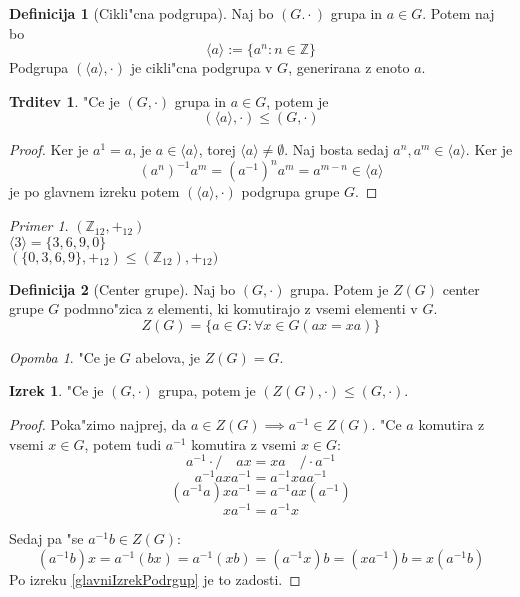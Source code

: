 \documentclass{article}
\theoremstyle{definition}
\newtheorem{definition}{Definicija}[section]
\newtheorem{claim}{Trditev}[section]
\newtheorem{theorem}{Izrek}[section]
\theoremstyle{remark}
\newtheorem*{ex}{Primer}
\newtheorem*{rem}{Opomba}
\newcommand{\Z}{\mathbb{Z}}
\begin{document}
	\begin{definition}[Cikli"cna podgrupa]
		Naj bo $(G. \cdot)$ grupa in $a \in G$. Potem naj bo
		\[ \langle a \rangle := \lbrace a^n: n \in \Z \rbrace \]
		Podgrupa $(\langle a \rangle, \cdot)$ je cikli"cna podgrupa v $G$, generirana z enoto $a$.
	\end{definition}
	\begin{claim}
		"Ce je $(G, \cdot)$ grupa in $a \in G$, potem je
		\[ (\langle a \rangle, \cdot) \leq (G, \cdot) \]
	\end{claim}
	\begin{proof}
		Ker je $a^1 = a$, je $a \in \langle a \rangle$, torej $\langle a \rangle \neq \emptyset$. Naj bosta sedaj $a^n, a^m \in \langle a \rangle$.
		Ker je \[(a^n)^{-1}a^m = (a^{-1})^na^m = a^{m-n} \in \langle a \rangle \]
		je po glavnem izreku potem $(\langle a \rangle, \cdot)$ podgrupa grupe $G$.
	\end{proof}

	\begin{ex}
		$(\Z_{12}, +_{12})$
		\\
		$\langle 3 \rangle = \lbrace 3, 6, 9, 0 \rbrace$
		\\
		$(\lbrace 0, 3, 6, 9 \rbrace, +_{12}) \leq (\Z_{12}), +_{12})$
	\end{ex}

	\begin{definition}[Center grupe]
		Naj bo $(G, \cdot)$ grupa. Potem je $Z(G)$ center grupe $G$ podmno"zica z elementi, ki komutirajo z vsemi elementi v $G$.
		\[ Z(G) = \lbrace a \in G: \forall x \in G(ax=xa) \rbrace \]
	\end{definition}

	\begin{rem}
		"Ce je $G$ abelova, je $Z(G) = G$.
	\end{rem}
	\begin{theorem}
		"Ce je $(G, \cdot)$ grupa, potem je $(Z(G), \cdot) \leq (G, \cdot)$.
	\end{theorem}
	\begin{proof}		
		Poka"zimo najprej, da $a \in Z(G) \implies a^{-1} \in Z(G)$. "Ce $a$ komutira z vsemi $x \in G$, potem tudi $a^{-1}$ komutira z vsemi $x \in G$:
		\[ a^{-1} \cdot / \quad ax = xa \quad / \cdot a^{-1} \]
		\[ a^{-1}axa^{-1} = a^{-1}xaa^{-1} \]
		\[ (a^{-1}a)xa^{-1} = a^{-1}ax(a^{-1}) \]
		\[ xa^{-1} = a^{-1}x \]
		
		Sedaj pa "se $a^{-1}b \in Z(G)$:
		\[ (a^{-1}b)x = a^{-1}(bx) = a^{-1}(xb) = (a^{-1}x)b = (xa^{-1})b = x(a^{-1}b) \]
		Po izreku \ref{glavniIzrekPodrgup} je to zadosti.
	\end{proof}

\end{document}
